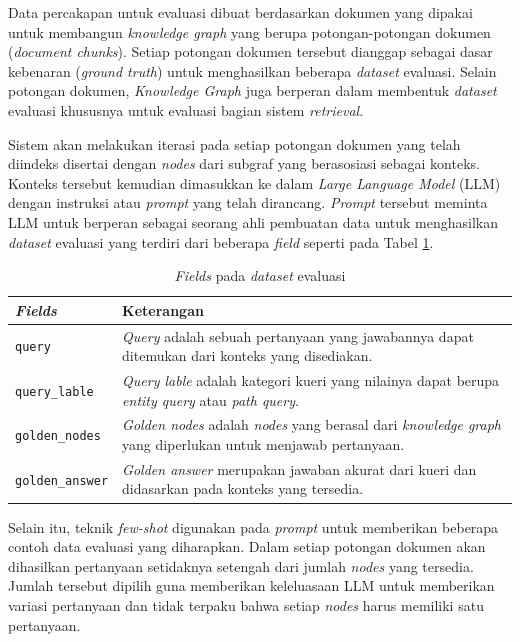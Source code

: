 Data percakapan untuk evaluasi dibuat berdasarkan dokumen yang dipakai untuk membangun \textit{knowledge graph} yang berupa potongan-potongan dokumen (\textit{document chunks}).
Setiap potongan dokumen tersebut dianggap sebagai dasar kebenaran (\textit{ground truth}) untuk menghasilkan beberapa \textit{dataset} evaluasi.
Selain potongan dokumen, \textit{Knowledge Graph} juga berperan dalam membentuk \textit{dataset} evaluasi khususnya untuk evaluasi bagian sistem \textit{retrieval}.

Sistem akan melakukan iterasi pada setiap potongan dokumen yang telah diindeks disertai dengan \textit{nodes} dari subgraf yang berasosiasi sebagai konteks.
Konteks tersebut kemudian dimasukkan ke dalam \textit{Large Language Model} (LLM) dengan instruksi atau \textit{prompt} yang telah dirancang.
\textit{Prompt} tersebut meminta LLM untuk berperan sebagai seorang ahli pembuatan data untuk menghasilkan \textit{dataset} evaluasi yang terdiri dari beberapa \textit{field} seperti pada Tabel \ref{tab:evaluation-dataset-fields}.

\begin{table}[h]
	\centering
	\caption{\textit{Fields} pada \textit{dataset} evaluasi}
	\label{tab:evaluation-dataset-fields}
	\begin{tabular}{|p{}|p{}|}
		\hline
		\textbf{\textit{Fields}} & \textbf{Keterangan}                                                                                    \\
		\hline
		\texttt{query}           &
		\textit{Query} adalah sebuah pertanyaan yang jawabannya dapat ditemukan dari konteks yang disediakan.                             \\
		\hline
		\texttt{query\_lable}    &
		\textit{Query lable} adalah kategori kueri yang nilainya dapat berupa \textit{entity query} atau \textit{path query}.             \\
		\hline
		\texttt{golden\_nodes}   &
		\textit{Golden nodes} adalah \textit{nodes} yang berasal dari \textit{knowledge graph} yang diperlukan untuk menjawab pertanyaan. \\
		\hline
		\texttt{golden\_answer}  &
		\textit{Golden answer} merupakan jawaban akurat dari kueri dan didasarkan pada konteks yang tersedia.                             \\
		\hline
	\end{tabular}
\end{table}

Selain itu, teknik \textit{few-shot} digunakan pada \textit{prompt} untuk memberikan beberapa contoh data evaluasi yang diharapkan.
Dalam setiap potongan dokumen akan dihasilkan pertanyaan setidaknya setengah dari jumlah \textit{nodes} yang tersedia.
Jumlah tersebut dipilih guna memberikan keleluasaan LLM untuk memberikan variasi pertanyaan dan tidak terpaku bahwa setiap \textit{nodes} harus memiliki satu pertanyaan.

